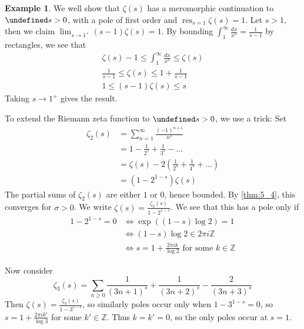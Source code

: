 \documentclass[11pt]{article}
\theoremstyle{definition}
\newtheorem{example}[definition]{Example}
\theoremstyle{plain}
\theoremstyle{remark}
\let\Re\undefined
\DeclareMathOperator{\Re}{Re}
\DeclareMathOperator{\res}{res}
\newcommand{\ZZ}{\mathbb{Z}}
\begin{document}
\begin{example}\label{eg:5_6}
    We well show that $\zeta(s)$ has a meromorphic continuation to $\Re s > 0$, with a pole of first order and $\res_{s=1} \zeta(s) = 1$. Let $s > 1$, then we claim $\lim_{s \to 1^+} (s-1) \zeta(s) = 1$. By bounding $\int_1^\infty \frac{dx}{x^s} = \frac{1}{s-1}$ by rectangles, we see that
    \begin{gather*}
        \zeta(s) - 1 \le \int_1^\infty \frac{dx}{x^s} \le \zeta(s)\\
        \frac{1}{s-1} \le \zeta(s) \le 1 + \frac{1}{s-1}\\
        1 \le (s-1) \zeta(s) \le s
    \end{gather*}
    Taking $s \to 1^+$ gives the result.

    To extend the Riemann zeta function to $\Re s > 0$, we use a trick: Set
    \begin{align*}
        \zeta_2(s)
        &= \sum_{n=1}^\infty \frac{(-1)^{n+1}}{n^s}\\
        &= 1 - \frac{1}{2^s} + \frac{1}{3^s} - \ldots\\
        &= \zeta(s) - 2\left(\frac{1}{2^s} + \frac{1}{4^s} + \ldots\right)\\
        &= (1-2^{1-s}) \zeta(s)
    \end{align*}
    The partial sums of $\zeta_2(s)$ are either $1$ or $0$, hence bounded. By \autoref{thm:5_4}, this converges for $\sigma > 0$. We write $\zeta(s) = \frac{\zeta_2(s)}{1-2^{1-s}}$. We see that this has a pole only if
    \begin{align*}
        1 - 2^{1-s} = 0
        &\iff \exp((1-s) \log 2) = 1\\
        &\iff (1-s) \log 2 \in 2 \pi i \ZZ\\
        &\iff s = 1 + \frac{2 \pi i k}{\log 2} \text{ for some } k \in \ZZ
    \end{align*}
\end{example}
Now consider
\begin{equation*}
    \zeta_3(s) = \sum_{n \ge 0} \frac{1}{(3n+1)^s} + \frac{1}{(3n+2)^s} - \frac{2}{(3n+3)^s}
\end{equation*}
Then $\zeta(s) = \frac{\zeta_3(s)}{1-3^{1-s}}$, so similarly poles occur only when $1-3^{1-s} = 0$, so $s = 1 + \frac{2 \pi i k'}{\log 3}$ for some $k' \in \ZZ$. Thus $k = k' = 0$, so the only poles occur at $s = 1$.
\end{document}
